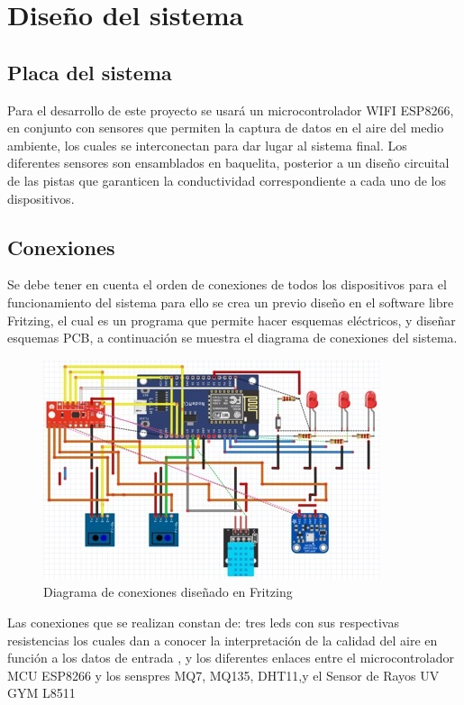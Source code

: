 \documentclass[10pt,a4paper]{article}
\begin{document}
\section{Diseño del sistema}
\subsection{Placa del sistema}

Para el desarrollo de este proyecto se usará un microcontrolador WIFI ESP8266, en conjunto con sensores que permiten la captura de datos en el aire del medio ambiente, los cuales se interconectan para dar lugar al sistema final.
Los diferentes sensores son ensamblados en baquelita, posterior a un diseño circuital de las pistas que garanticen la conductividad correspondiente a cada uno de los dispositivos.

\subsection{Conexiones}

Se debe tener en cuenta el orden de conexiones de todos los dispositivos para el funcionamiento del sistema para ello se crea un previo diseño en el software libre Fritzing, el cual es un programa que permite hacer esquemas eléctricos, y diseñar esquemas PCB, a continuación se muestra el diagrama de conexiones del sistema. 

\begin{figure}[H]
\centering
 \includegraphics[scale=0.80]{fritzingcorregido.JPG} 
\caption{Diagrama de conexiones diseñado en Fritzing} 
\end{figure}

Las conexiones que se realizan constan de: tres leds con sus respectivas resistencias los cuales dan a conocer la interpretación de la calidad del aire en función a los datos de entrada , y los diferentes enlaces entre el microcontrolador MCU ESP8266 y los senspres MQ7, MQ135, DHT11,y el Sensor de Rayos UV GYM L8511
\end{document}
